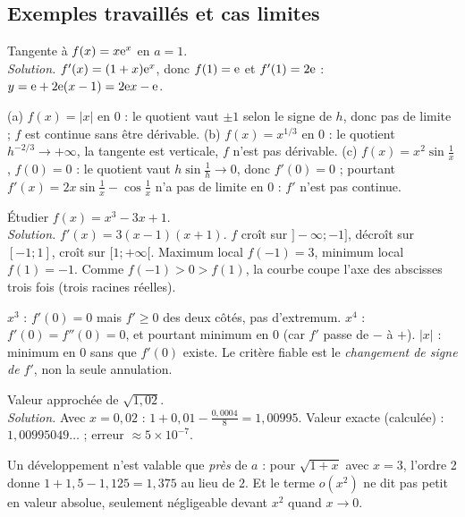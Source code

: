 \subsection{Exemples travaillés et cas limites}
\begin{exemple}[tangente]
Tangente à $f(x)=x\mathrm{e}^x$ en $a=1$.\\
\emph{Solution.} $f'(x)=(1+x)\mathrm{e}^x$, donc $f(1)=\mathrm{e}$ et $f'(1)=2\mathrm{e}$ : $y=\mathrm{e}+2\mathrm{e}(x-1)=2\mathrm{e} x-\mathrm{e}$.
\end{exemple}
\begin{cas}
(a) $f(x)=|x|$ en $0$ : le quotient vaut $\pm1$ selon le signe de $h$, donc pas de limite ; $f$ est continue sans être dérivable. (b) $f(x)=x^{1/3}$ en $0$ : le quotient $h^{-2/3}\to+\infty$, la tangente est verticale, $f$ n'est pas dérivable. (c) $f(x)=x^2\sin\frac1x$, $f(0)=0$ : le quotient vaut $h\sin\frac1h\to0$, donc $f'(0)=0$ ; pourtant $f'(x)=2x\sin\frac1x-\cos\frac1x$ n'a pas de limite en $0$ : $f'$ n'est pas continue.
\end{cas}
\begin{exemple}[variations]
Étudier $f(x)=x^3-3x+1$.\\
\emph{Solution.} $f'(x)=3(x-1)(x+1)$. $f$ croît sur $]-\infty;-1]$, décroît sur $[-1;1]$, croît sur $[1;+\infty[$. Maximum local $f(-1)=3$, minimum local $f(1)=-1$. Comme $f(-1)>0>f(1)$, la courbe coupe l'axe des abscisses trois fois (trois racines réelles).
\end{exemple}
\begin{cas}[$f'(a)=0$ sans conclusion immédiate]
$x^3$ : $f'(0)=0$ mais $f'\ge0$ des deux côtés, pas d'extremum. $x^4$ : $f'(0)=f''(0)=0$, et pourtant minimum en $0$ (car $f'$ passe de $-$ à $+$). $|x|$ : minimum en $0$ sans que $f'(0)$ existe. Le critère fiable est le \emph{changement de signe de $f'$}, non la seule annulation.
\end{cas}
\begin{exemple}
Valeur approchée de $\sqrt{1{,}02}$.\\
\emph{Solution.} Avec $x=0{,}02$ : $1+0{,}01-\frac{0{,}0004}8=1{,}00995$. Valeur exacte (calculée) : $1{,}00995049\ldots$ ; erreur $\approx5\times10^{-7}$.
\end{exemple}
\begin{cas}
Un développement n'est valable que \emph{près} de $a$ : pour $\sqrt{1+x}$ avec $x=3$, l'ordre 2 donne $1+1{,}5-1{,}125=1{,}375$ au lieu de $2$. Et le terme $o(x^2)$ ne dit pas \og petit \fg{} en valeur absolue, seulement négligeable devant $x^2$ quand $x\to0$.
\end{cas}
